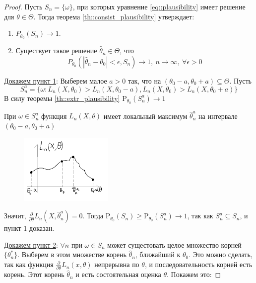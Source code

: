 \documentclass[12pt]{article}
\theoremstyle{basic_theorem}
\theoremstyle{name_theorem}
\def\P{
    \mathrm{P}
}
\begin{document}
    \begin{proof}
        Пусть $S_n = \{\omega\}$, при которых уравнение \eqref{eq::plausibility} имеет
        решение для $\theta\in\Theta$. Тогда теорема \ref{th::consist_plausibility} утверждает:
        \begin{enumerate}
            \item $P_{\theta_0}(S_n) \rightarrow 1$.
            \item Существует такое решение $\hat{\theta}_n \in \Theta$, что
                $$P_{\theta_0} (|\hat{\theta}_n - \theta_0| < \epsilon, S_n) \rightarrow 1,\ n\rightarrow\infty,\ \forall\epsilon>0$$
        \end{enumerate}
        \underline{Докажем пункт 1}: Выберем малое $a>0$ так, что на $(\theta_0 - a, \theta_0 + a) \subseteq\Theta$. Пусть
        $$S^a_n = \{\omega: L_n(X, \theta_0) > L_n(X, \theta_0 - a), L_n(X, \theta_0) > L_n(X, \theta_0 + a)\}$$
        В силу теоремы \ref{th::extr_plausibility} $\P_{\theta_0}(S_n^a) \rightarrow 1$

        При $\omega\in S_n^a$ функция $L_n(X, \theta)$ имеет
        локальный максимум $\hat{\theta}^a_n$ на интервале $(\theta_0 - a, \theta_0 + a)$
        \begin{figure}[h]
            \includegraphics[width=0.4\textwidth]{L_n_func}
        \end{figure}
        
        Значит, $\frac{\partial}{\partial\theta}L_n(X, \hat{\theta}_n^a) = 0$.
        Тогда $\P_{\theta_0}(S_n) \geq \P_{\theta_0}(S_n^a) \rightarrow 1$, так
        как $S_n^a \subseteq S_n$, и пункт 1 доказан.

        \underline{Докажем пункт 2}: $\forall n$ при $\omega\in S_n$ может сущестовать целое множество корней
        $\{\theta^*_n\}$. Выберем в этом множестве корень $\hat{\theta}_n$,
        ближайший к $\theta_0$. Это можно сделать, так как
        функция $\frac{\partial}{\partial\theta} L_n(x, \theta)$ непрерывна по $\theta$,
        и последовательность корней есть корень. Этот корень $\hat{\theta}_n$
        и есть состоятельная оценка $\theta$. Покажем это:


\end{proof}
\end{document}
